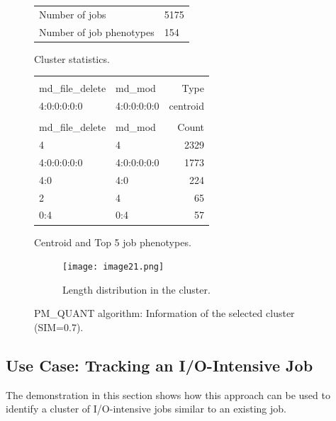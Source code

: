 \documentclass{jhps}
\begin{document}
\begin{figure}
	\begin{subtable}{\textwidth}
	 \centering
	 \begin{tabular}{ll}
		 Number of jobs & 5175 \\
		 Number of job phenotypes & 154 \\
	 \end{tabular}
	 \caption{Cluster statistics.}
	 \label{cluster:pm_quant:stats}
	\end{subtable}
	\medskip
	\begin{subtable}{\textwidth}
	 \centering
	 \begin{tiny}
		 \begin{tabular}{ll|r}
			 \rowcolor{tblhead}
			 \multicolumn{2}{l|}{Hexadecimal coding} &              \\
			 \rowcolor{tblhead}
			 md\_file\_delete     &  md\_mod     & Type     \\
			 \hline
			 4:0:0:0:0:0          &  4:0:0:0:0:0 & centroid \\
			 \multicolumn{3}{l}{} \\
			 \rowcolor{tblhead}
			 md\_file\_delete     &  md\_mod     & Count    \\
			 \hline
			 4                    &  4           & 2329     \\
			 4:0:0:0:0:0          &  4:0:0:0:0:0 & 1773     \\
			 4:0                  &  4:0         & 224      \\
			 2                    &  4           & 65       \\
			 0:4                  &  0:4         & 57       \\
		 \end{tabular}
	 \end{tiny}
	 \caption{Centroid and Top 5 job phenotypes.}
	 \label{cluster:pm_quant:top_jobs}
	\end{subtable}
	\medskip
	\begin{subfigure}{\textwidth}
		\centering
		\texttt{[image: image21.png]}
		\caption{Length distribution in the cluster.}
		\label{cluster:pm_quant:length}
	\end{subfigure}
	\caption{PM\_QUANT algorithm: Information of the selected cluster (SIM=0.7).}
	\label{cluster:pm_quant}
\end{figure}

\FloatBarrier
\subsection{Use Case: Tracking an I/O-Intensive Job}
The demonstration in this section shows how this approach can be used to identify a cluster of I/O-intensive jobs similar to an existing job.
\end{document}
